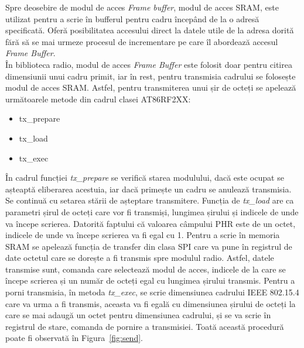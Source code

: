 \documentclass[12pt,a4paper]{report}
\begin{document}
Spre deosebire de modul de acces \textit{Frame buffer}, modul de acces SRAM, este utilizat pentru a scrie în bufferul pentru cadru începând de la o adresă specificată. Oferă posibilitatea accesului direct la datele utile de la adresa dorită fără să se mai urmeze procesul de incrementare pe care îl abordează accesul \textit{Frame Buffer}.\\
În biblioteca radio, modul de acces \textit{Frame Buffer} este folosit doar pentru citirea dimensiunii unui cadru primit, iar în rest, pentru transmisia cadrului se folosește modul de acces SRAM. Astfel, pentru transmiterea unui șir de octeți se apelează următoarele metode din cadrul clasei AT86RF2XX:
\begin{itemize}
\item tx\_prepare
\item tx\_load
\item tx\_exec
\end{itemize}
În cadrul funcției \textit{tx\_prepare} se verifică starea modulului,  dacă este ocupat se așteaptă eliberarea acestuia, iar dacă primește un cadru se anulează transmisia. Se continuă cu setarea stării de așteptare transmitere.
Funcția de \textit{tx\_load} are ca parametri șirul de octeți care vor fi transmiși, lungimea șirului și indicele de unde va începe scrierea. Datorită faptului că valoarea câmpului PHR este de un octet, indicele de unde va începe scrierea va fi egal cu 1. Pentru a scrie în memoria SRAM se apelează funcția de transfer din clasa SPI care va pune în registrul de date octetul care se dorește a fi transmis spre modulul radio. Astfel, datele transmise sunt, comanda care selectează modul de acces, indicele de la care se începe scrierea și un număr de octeți egal cu lungimea șirului transmis.
Pentru a porni transmisia, în metoda \textit{tx\_exec}, se scrie dimensiunea cadrului IEEE 802.15.4 care va urma a fi transmis, aceasta va fi egală cu dimensiunea șirului de octeți la care se mai adaugă un octet pentru dimensiunea cadrului, și se va scrie în registrul de stare, comanda de pornire a transmisiei. Toată această procedură poate fi observată în Figura~\ref{fig:send}.
\end{document}
